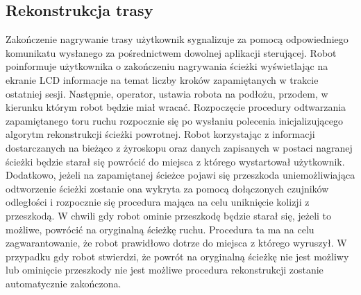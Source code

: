 \subsection{Rekonstrukcja trasy}
Zakończenie nagrywanie trasy użytkownik sygnalizuje za pomocą odpowiedniego
komunikatu wysłanego za pośrednictwem dowolnej aplikacji sterującej. Robot
poinformuje użytkownika o zakończeniu nagrywania ścieżki wyświetlając na ekranie
LCD informacje na temat liczby kroków zapamiętanych w trakcie ostatniej sesji.
Następnie, operator, ustawia robota na podłożu, przodem, w kierunku którym robot
będzie miał wracać. Rozpoczęcie procedury odtwarzania zapamiętanego toru ruchu
rozpocznie się po wysłaniu polecenia inicjalizującego algorytm rekonstrukcji
ścieżki powrotnej. Robot korzystając z informacji dostarczanych na bieżąco z
żyroskopu oraz danych zapisanych w postaci nagranej ścieżki będzie starał się
powrócić do miejsca z którego wystartował użytkownik. Dodatkowo, jeżeli na
zapamiętanej ścieżce pojawi się przeszkoda uniemożliwiająca odtworzenie ścieżki
zostanie ona wykryta za pomocą dołączonych czujników odległości i rozpocznie się
procedura mająca na celu uniknięcie kolizji z przeszkodą. W chwili gdy robot
ominie przeszkodę będzie starał się, jeżeli to możliwe, powrócić na oryginalną
ścieżkę ruchu. Procedura ta ma na celu zagwarantowanie, że robot prawidłowo
dotrze do miejsca z którego wyruszył. W przypadku gdy robot stwierdzi, że powrót
na oryginalną ścieżkę nie jest możliwy lub ominięcie przeszkody nie jest możliwe
procedura rekonstrukcji zostanie automatycznie zakończona. 
